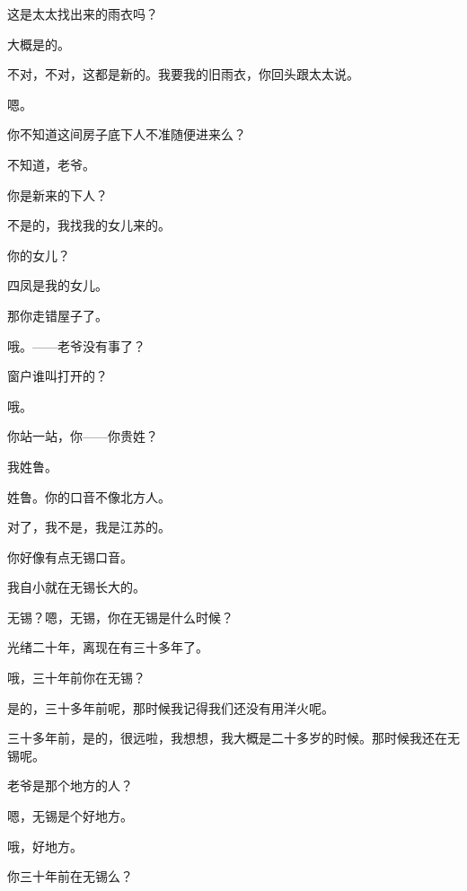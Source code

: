 这是太太找出来的雨衣吗？

大概是的。

不对，不对，这都是新的。我要我的旧雨衣，你回头跟太太说。

嗯。

你不知道这间房子底下人不准随便进来么？

不知道，老爷。

你是新来的下人？

不是的，我找我的女儿来的。

你的女儿？

四凤是我的女儿。

那你走错屋子了。

哦。——老爷没有事了？

窗户谁叫打开的？

哦。

你站一站，你——你贵姓？

我姓鲁。

姓鲁。你的口音不像北方人。

对了，我不是，我是江苏的。

你好像有点无锡口音。

我自小就在无锡长大的。

无锡？嗯，无锡，你在无锡是什么时候？

光绪二十年，离现在有三十多年了。

哦，三十年前你在无锡？

是的，三十多年前呢，那时候我记得我们还没有用洋火呢。

三十多年前，是的，很远啦，我想想，我大概是二十多岁的时候。那时候我还在无锡呢。

老爷是那个地方的人？

嗯，无锡是个好地方。

哦，好地方。

你三十年前在无锡么？

